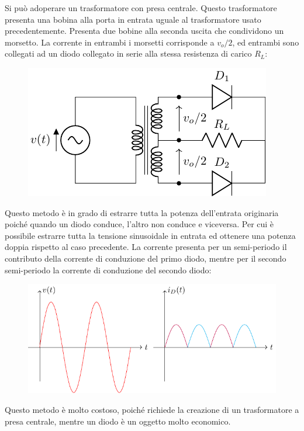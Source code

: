 \documentclass{article}
\numberwithin{equation}{subsection}
\begin{document}
Si può adoperare un trasformatore con presa centrale. 
Questo trasformatore presenta una bobina alla porta in entrata uguale al trasformatore usato precedentemente. Presenta due bobine alla seconda uscita che condividono un 
morsetto. 
La corrente in entrambi i morsetti corrisponde a $v_o/2$, ed entrambi sono collegati ad un diodo collegato in serie alla stessa resistenza di carico $R_L$:
\begin{figure}[H]%
    \centering
    \includegraphics{alimentatore-presa-centrale.pdf}%
    \label{fig:alimentatore-presa-centrale}
\end{figure}
Questo metodo è in grado di estrarre tutta la potenza dell'entrata originaria poiché quando 
un diodo conduce, l'altro non conduce e viceversa. Per cui è possibile estrarre tutta la tensione sinusoidale in entrata ed ottenere una potenza doppia rispetto al caso precedente. 
La corrente presenta per un semi-periodo il contributo della corrente di conduzione del primo diodo, mentre per il secondo semi-periodo la corrente di conduzione del 
secondo diodo:
\begin{figure}[H]%
    \centering
    \includegraphics{andamento-alimentatore-presa-centrale.pdf}%
    \label{fig:andamento-alimentatore-presa-centrale}
\end{figure}
Questo metodo è molto costoso, poiché richiede la creazione di un trasformatore a presa centrale, mentre un diodo è un oggetto molto economico.
\end{document}
